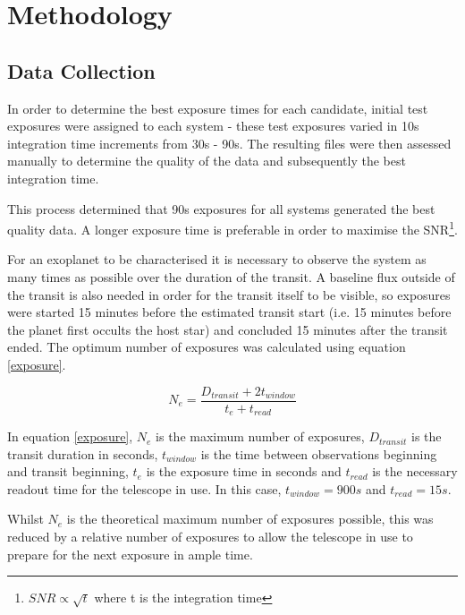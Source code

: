 \documentclass{report}
\begin{document}

\section{Methodology}
\subsection{Data Collection}
In order to determine the best exposure times for each candidate, initial test exposures
were assigned to each system - these test exposures varied in 10s integration time
increments from 30s - 90s. The resulting files were then assessed manually to determine
the quality of the data and subsequently the best integration time.

This process determined that 90s exposures for all systems generated the best quality
data. A longer exposure time is preferable in order to maximise the SNR\footnote{$SNR 
\propto \sqrt{t}$ where t is the integration time}. 

For an exoplanet to be characterised it is necessary to observe the system as many times as possible over the duration of the transit. A baseline flux outside of the transit is also needed in order for the transit itself to be visible, so exposures were started 15 minutes before the estimated transit start (i.e. 15 minutes before the planet first occults the host star) and concluded 15 minutes after the transit ended. The optimum number of exposures was calculated using equation \ref{exposure}. 

\begin{equation} \label{exposure}
    N_{e} = \frac{D_{transit} + 2t_{window}}{t_{e} + t_{read}}
\end{equation}

In equation \ref{exposure}, $N_{e}$ is the maximum number of exposures, $D_{transit}$ is the transit duration in seconds, $t_{window}$ is the time between observations beginning and transit beginning, $t_{e}$ is the exposure time in seconds and $t_{read}$ is the necessary readout time for the telescope in use. In this case, $t_{window}=900s$ and $t_{read}=15s$.

Whilst $N_{e}$ is the theoretical maximum number of exposures possible, this was reduced by a relative number of exposures to allow the telescope in use to prepare for the next exposure in ample time. 
\end{document}
